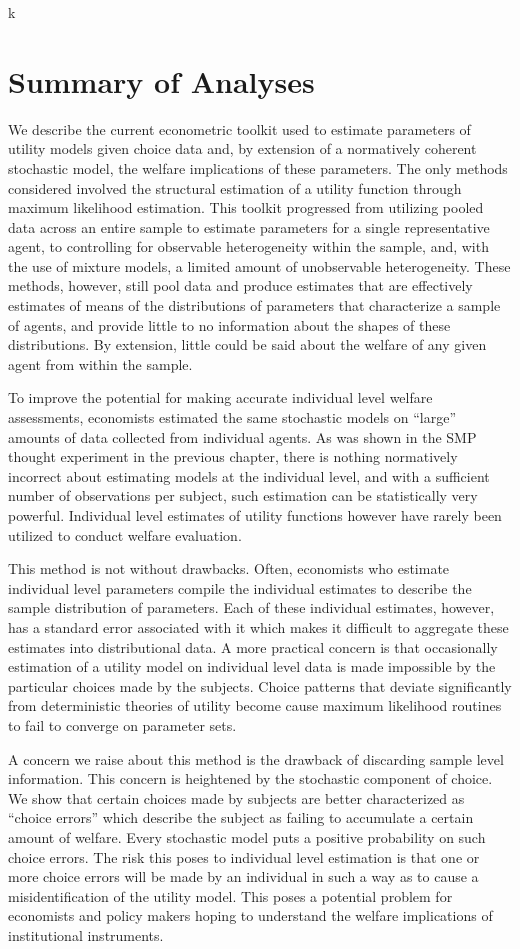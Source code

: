\documentclass[../main.tex]{subfiles}
\begin{document}
k
\section{Summary of Analyses}

We describe the current econometric toolkit used to estimate parameters of utility models given choice data and, by extension of a normatively coherent stochastic model, the welfare implications of these parameters.
The only methods considered involved the structural estimation of a utility function through maximum likelihood estimation.
This toolkit progressed from utilizing pooled data across an entire sample to estimate parameters for a single representative agent, to controlling for observable heterogeneity within the sample, and, with the use of mixture models, a limited amount of unobservable heterogeneity.
These methods, however, still pool data and produce estimates that are effectively estimates of means of the distributions of parameters that characterize a sample of agents, and provide little to no information about the shapes of these distributions.
By extension, little could be said about the welfare of any given agent from within the sample.

To improve the potential for making accurate individual level welfare assessments, economists estimated the same stochastic models on \enquote{large} amounts of data collected from individual agents.
As was shown in the SMP thought experiment in the previous chapter, there is nothing normatively incorrect about estimating models at the individual level, and with a sufficient number of observations per subject, such estimation can be statistically very powerful.
Individual level estimates of utility functions however have rarely been utilized to conduct welfare evaluation.

This method is not without drawbacks.
Often, economists who estimate individual level parameters compile the individual estimates to describe the sample distribution of parameters.
Each of these individual estimates, however, has a standard error associated with it which makes it difficult to aggregate these estimates into distributional data.
A more practical concern is that occasionally estimation of a utility model on individual level data is made impossible by the particular choices made by the subjects.
Choice patterns that deviate significantly from deterministic theories of utility become cause maximum likelihood routines to fail to converge on parameter sets.

A concern we raise about this method is the drawback of discarding sample level information.
This concern is heightened by the stochastic component of choice.
We show that certain choices made by subjects are better characterized as \enquote{choice errors} which describe the subject as failing to accumulate a certain amount of welfare.
Every stochastic model puts a positive probability on such choice errors.
The risk this poses to individual level estimation is that one or more choice errors will be made by an individual in such a way as to cause a misidentification of the utility model.
This poses a potential problem for economists and policy makers hoping to understand the welfare implications of institutional instruments.
\end{document}
